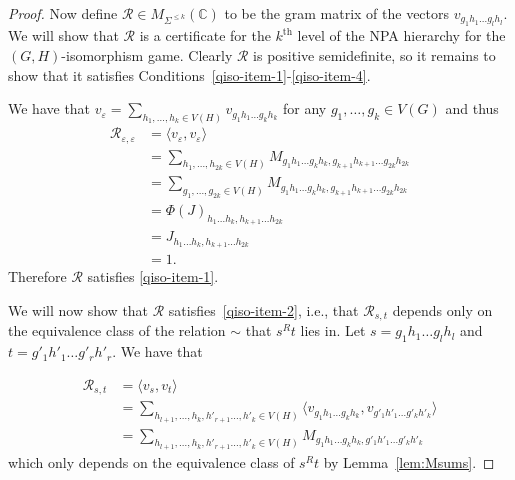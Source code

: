 \documentclass[a4paper,onecolumn,11pt,accepted=2026-01-06]{quantumarticle}
\theoremstyle{plain}
\theoremstyle{remark}
\theoremstyle{definition}
\renewcommand{\epsilon}{\varepsilon}
\begin{document}
\begin{proof}
Now define $\mathcal{R} \in M_{\Sigma^{\le k}}(\mathbb{C})$ to be the gram matrix of the vectors $v_{g_1h_1\ldots g_lh_l}$. We will show that $\mathcal{R}$ is a certificate for the $k^\text{th}$ level of the NPA hierarchy for the $(G,H)$-isomorphism game. Clearly $\mathcal{R}$ is positive semidefinite, so it remains to show that it satisfies Conditions~\ref{qiso-item-1}-\ref{qiso-item-4}.

We have that $v_\epsilon = \sum_{h_1,\ldots, h_k \in V(H)} v_{g_1h_1\ldots g_kh_k}$ for any $g_1, \ldots, g_k \in V(G)$ and thus
\begin{align*}
     \mathcal{R}_{\epsilon,\epsilon} &= \langle v_\epsilon, v_\epsilon \rangle \\
     &= \sum_{h_1, \ldots, h_{2k} \in V(H)} M_{g_1h_1\ldots g_kh_k,g_{k+1}h_{k+1}\ldots g_{2k}h_{2k}} \\
     &= \sum_{g_1, \ldots, g_{2k} \in V(H)} M_{g_1h_1\ldots g_kh_k,g_{k+1}h_{k+1}\ldots g_{2k}h_{2k}} \\
     &= \Phi(J)_{h_1\ldots h_k,h_{k+1}\ldots h_{2k}} \\
     &= J_{h_1\ldots h_k,h_{k+1}\ldots h_{2k}} \\
     &= 1.
\end{align*}
Therefore $\mathcal{R}$ satisfies \ref{qiso-item-1}.

We will now show that $\mathcal{R}$ satisfies~\ref{qiso-item-2}, i.e., that $\mathcal{R}_{s,t}$ depends only on the equivalence class of the relation $\sim$ that $s^Rt$ lies in. Let $s = g_1h_1\ldots g_lh_l$ and $t = g'_1h'_1\ldots g'_rh'_r$. We have that

\begin{align}
    \mathcal{R}_{s,t} &= \langle v_s, v_t \rangle \\
    &= \sum_{h_{l+1}, \ldots, h_k, h'_{r+1} \ldots, h'_k \in V(H)} \langle v_{g_1h_1\ldots g_kh_k}, v_{g'_1h'_1\ldots g'_kh'_k} \rangle \\
    &= \sum_{h_{l+1}, \ldots, h_k, h'_{r+1} \ldots, h'_k \in V(H)} M_{g_1h_1\ldots g_kh_k, g'_1h'_1\ldots g'_kh'_k} \label{eq:RfromM}
\end{align}
which only depends on the equivalence class of $s^Rt$ by Lemma~\ref{lem:Msums}.


\end{proof}
\end{document}
